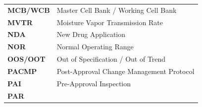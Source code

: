 \documentclass[
  11pt,
  a4paper,
]{report}
\begin{document}
\begin{longtable}[]{@{}ll@{}}
\begin{minipage}[t]{0.33\columnwidth}
\textbf{MCB/WCB}\strut
\end{minipage} & \begin{minipage}[t]{0.61\columnwidth}\raggedright
Master Cell Bank / Working Cell Bank\strut
\end{minipage}\tabularnewline
\begin{minipage}[t]{0.33\columnwidth}\raggedright
\textbf{MVTR}\strut
\end{minipage} & \begin{minipage}[t]{0.61\columnwidth}\raggedright
Moisture Vapor Transmission Rate\strut
\end{minipage}\tabularnewline
\begin{minipage}[t]{0.33\columnwidth}\raggedright
\textbf{NDA}\strut
\end{minipage} & \begin{minipage}[t]{0.61\columnwidth}\raggedright
New Drug Application\strut
\end{minipage}\tabularnewline
\begin{minipage}[t]{0.33\columnwidth}\raggedright
\textbf{NOR}\strut
\end{minipage} & \begin{minipage}[t]{0.61\columnwidth}\raggedright
Normal Operating Range\strut
\end{minipage}\tabularnewline
\begin{minipage}[t]{0.33\columnwidth}\raggedright
\textbf{OOS/OOT}\strut
\end{minipage} & \begin{minipage}[t]{0.61\columnwidth}\raggedright
Out of Specification / Out of Trend\strut
\end{minipage}\tabularnewline
\begin{minipage}[t]{0.33\columnwidth}\raggedright
\textbf{PACMP}\strut
\end{minipage} & \begin{minipage}[t]{0.61\columnwidth}\raggedright
Post-Approval Change Management Protocol\strut
\end{minipage}\tabularnewline
\begin{minipage}[t]{0.33\columnwidth}\raggedright
\textbf{PAI}\strut
\end{minipage} & \begin{minipage}[t]{0.61\columnwidth}\raggedright
Pre-Approval Inspection\strut
\end{minipage}\tabularnewline
\begin{minipage}[t]{0.33\columnwidth}\raggedright
\textbf{PAR}\strut
\end{minipage} & \begin{minipage}[t]{0.61\columnwidth}\raggedright

\end{minipage}
\end{longtable}
\end{document}
